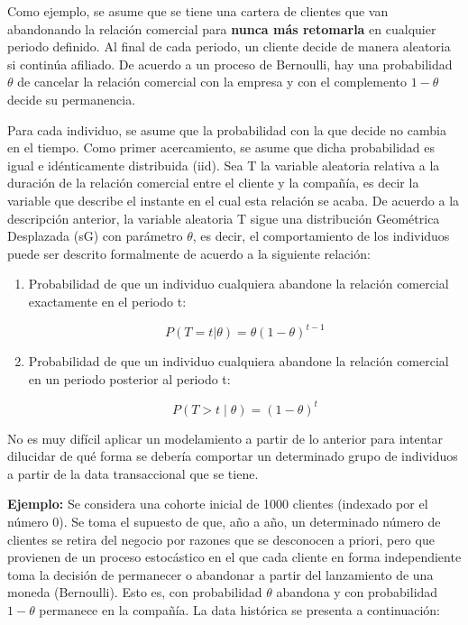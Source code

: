 \documentclass[
]{book}
\begin{document}
Como ejemplo, se asume que se tiene una cartera de clientes que van
abandonando la relación comercial para \textbf{nunca más retomarla} en
cualquier periodo definido. Al final de cada periodo, un cliente decide
de manera aleatoria si continúa afiliado. De acuerdo a un proceso de
Bernoulli, hay una probabilidad \(\theta\) de cancelar la relación
comercial con la empresa y con el complemento \(1-\theta\) decide su
permanencia.

Para cada individuo, se asume que la probabilidad con la que decide no
cambia en el tiempo. Como primer acercamiento, se asume que dicha
probabilidad es igual e idénticamente distribuida (iid). Sea T la
variable aleatoria relativa a la duración de la relación comercial entre
el cliente y la compañía, es decir la variable que describe el instante
en el cual esta relación se acaba. De acuerdo a la descripción anterior,
la variable aleatoria T sigue una distribución Geométrica Desplazada
(sG) con parámetro \(\theta\), es decir, el comportamiento de los
individuos puede ser descrito formalmente de acuerdo a la siguiente
relación:

\begin{enumerate}
\def\labelenumi{\arabic{enumi}.}
\item
  Probabilidad de que un individuo cualquiera abandone la relación
  comercial exactamente en el periodo t:

  \[P(T=t| \theta) = \theta (1 - \theta)^{t-1}\]
\item
  Probabilidad de que un individuo cualquiera abandone la relación
  comercial en un periodo posterior al periodo t:

  \[P(T>t \;|\; \theta) = (1 - \theta)^{t}\]
\end{enumerate}

No es muy difícil aplicar un modelamiento a partir de lo anterior para
intentar dilucidar de qué forma se debería comportar un determinado
grupo de individuos a partir de la data transaccional que se tiene.

\textbf{Ejemplo:} Se considera una cohorte inicial de 1000 clientes (indexado
por el número 0). Se toma el supuesto de que, año a año, un determinado
número de clientes se retira del negocio por razones que se desconocen a
priori, pero que provienen de un proceso estocástico en el que cada
cliente en forma independiente toma la decisión de permanecer o
abandonar a partir del lanzamiento de una moneda (Bernoulli). Esto es,
con probabilidad \(\theta\) abandona y con probabilidad \(1 - \theta\)
permanece en la compañía. La data histórica se presenta a continuación:
\end{document}
